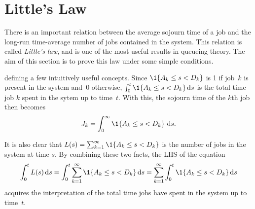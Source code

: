 



\section{Little's Law}
\label{sec:littles-law}

There is an important relation between the average sojourn time of a job and the long-run time-average number of jobs contained in the system.
This relation is called \emph{Little's law}, and is one of the most useful results in queueing theory.
The aim of this section is to prove this law under some simple conditions.


 defining a few intuitively useful concepts.
Since $\1{A_{k}\leq s < D_{k}}$ is 1 if job~$k$ is present in the system and~0 otherwise, $\int_{0}^{t} \1{A_{k}\leq s < D_{k}} \d s$ is the total time job $k$ spent in the sytem up to time~$t$. With this, the sojourn time of the $k$th job then becomes
\begin{equation*}
 \J_k = \int_0^\infty \1{A_k \leq s < D_k}\,\d s.
\end{equation*}


It is also clear that $\L(s) = \sum_{k=1}^\infty \1{A_k \leq s < D_k}$ is the number of jobs in the system at time $s$.
By combining these two facts, the LHS of the equation
\begin{equation}\label{eq:little:2}
\int_{0}^{t}\L(s) \d s = \int_{0}^{t }\sum_{k=1}^\infty \1{A_k \leq s < D_k} \d s = \sum_{k=1}^\infty \int_{0}^{t }\1{A_k \leq s < D_k} \d s
\end{equation}
acquires the interpretation of the total time jobs have spent in the system up to time~$t$.


